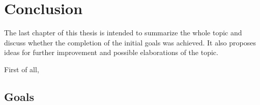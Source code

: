 \chapter{Conclusion}
\label{chp:conclusion}

The last chapter of this thesis is intended to summarize the whole topic and discuss whether the completion of the initial goals was achieved. It also proposes ideas for further improvement and possible elaborations of the topic.

First of all, 

\section{Goals}

